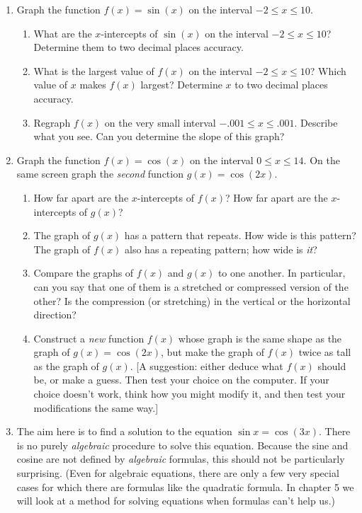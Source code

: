 \begin{enumerate}
\item Graph the function $f(x) = \sin(x)$ on the interval $-2 \leq x
\leq 10$.

  \begin{enumerate}
  \item What are the $x$-intercepts of $\sin(x)$ on the interval $-2 \leq
x \leq 10$?  Determine them to two decimal places accuracy.

  \item What is the largest value of $f(x)$ on the interval $-2 \leq x
\leq 10$?  Which value of $x$ makes $f(x)$ largest?  Determine $x$ to
two decimal places accuracy.

  \item Regraph $f(x)$ on the very small interval $-.001 \leq x \leq
.001$.  Describe what you see.  Can you determine the slope of this
graph?


\end{enumerate}
\item Graph the function $f(x) = \cos(x)$ on the interval $0 \leq x
\leq 14$.  On the same screen graph the {\em second\/} function $g(x)
= \cos(2x)$.

  \begin{enumerate}
  \item How far apart are the $x$-intercepts of $f(x)$?  How far apart
are the $x$-intercepts of $g(x)$?

  \item The graph of $g(x)$ has a pattern that repeats.  How wide is this
pattern?  The graph of $f(x)$ also has a repeating pattern; how wide
is {\em it\/}?

  \item Compare the graphs of $f(x)$ and $g(x)$ to one another.  In
particular, can you say that one of them is a stretched or compressed
version of the other?  Is the compression (or stretching) in the
vertical or the horizontal direction?

  \item Construct a {\em new\/} function $f(x)$ whose graph is the same
shape as the graph of $g(x) = \cos(2x)$, but make the graph of $f(x)$
twice as tall as the graph of $g(x)$.  [A suggestion: either deduce
  what $f(x)$ should be, or make a guess.  Then test your choice on
  the computer.  If your choice doesn't work, think how you might
  modify it, and then test your modifications the same way.]


\end{enumerate}
\item The aim here is to find a solution to the equation $\sin x =
\cos(3x)$.  There is no purely {\em algebraic\/} procedure to solve
this equation.  Because the sine and cosine are not defined by {\em
  algebraic} formulas, this should not be particularly surprising.
(Even for algebraic equations, there are only a few very special cases
for which there are formulas like the quadratic formula. In chapter 5
we will look at a method for solving equations when formulas can't
help us.)



\end{enumerate}
